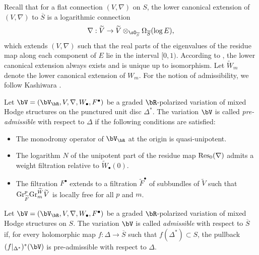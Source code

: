 \documentclass[11pt,letterpaper]{amsart}
\numberwithin{equation}{section}
\begin{document}
	Recall that for a flat connection $(V, \nabla)$ on $S$, the lower canonical extension of $(V, \nabla)$ to $\overline{S}$ is a logarithmic connection  
	\[
	\nabla: \widetilde{V} \to \widetilde{V} \otimes_{\sO_{\overline{S}}} \Omega_{\overline{S}}(\log E),
	\]  
	which extends $(V, \nabla)$ such that the real parts of the eigenvalues of the residue map along each component of $E$ lie in the interval $[0, 1)$. According to \cite[Proposition 5.4]{Deligne1970}, the lower canonical extension always exists and is unique up to isomorphism. Let $\widetilde{W}_m$ denote the lower canonical extension of $W_m$. For the notion of admissibility, we follow Kashiwara \cite{Kashiwara1986}. 
	\begin{defn}  
		Let $\bV = (\bV_{\bR}, V, \nabla, W_\bullet, F^\bullet)$ be a graded $\bR$-polarized variation of mixed Hodge structures on the punctured unit disc $\Delta^\ast$. The variation $\bV$ is called \emph{pre-admissible} with respect to $\Delta$ if the following conditions are satisfied:  
		\begin{itemize}  
			\item The monodromy operator of $\bV_{\bR}$ at the origin is quasi-unipotent.  
			\item The logarithm $N$ of the unipotent part of the residue map ${\rm Res}_0(\nabla)$ admits a weight filtration relative to $\widetilde{W}_\bullet(0)$.  
			\item The filtration $F^\bullet$ extends to a filtration $\widetilde{F}^\bullet$ of subbundles of $\widetilde{V}$ such that ${\rm Gr}_{\widetilde{F}}^p {\rm Gr}^{\widetilde{W}}_m \widetilde{V}$ is locally free for all $p$ and $m$.  
		\end{itemize}  
	\end{defn}
	\begin{defn}  
		Let $\bV = (\bV_{\bR}, V, \nabla, W_\bullet, F^\bullet)$ be a graded $\bR$-polarized variation of mixed Hodge structures on $S$. The variation $\bV$ is called \emph{admissible} with respect to $\overline{S}$ if, for every holomorphic map $f: \Delta \to \overline{S}$ such that $f(\Delta^\ast) \subset S$, the pullback $(f|_{\Delta^\ast})^\ast(\bV)$ is pre-admissible with respect to $\Delta$.  
	\end{defn}
\end{document}
